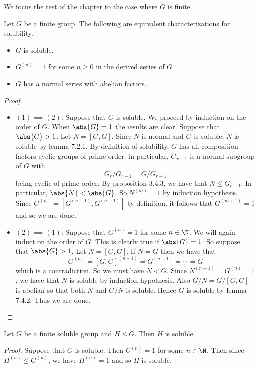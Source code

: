 \documentclass[a4paper]{article}
\begin{document}
We focus the rest of the chapter to the case where $G$ is finite. 

\begin{thm}{}{} Let $G$ be a finite group. The following are equivalent characterizations for solubility. 
\begin{itemize}
\item $G$ is soluble. 
\item $G^{(n)}=1$ for some $n\geq 0$ in the derived series of $G$
\item $G$ has a normal series with abelian factors. 
\end{itemize} 
\begin{proof}~\\
\begin{itemize}
\item $(1)\implies(2)$: Suppose that $G$ is soluble. We proceed by induction on the order of $G$. When $\abs{G}=1$ the results are clear. Suppose that $\abs{G}>1$. Let $N=[G,G]$. Since $N$ is normal and $G$ is soluble, $N$ is soluble by lemma 7.2.1. By definition of solubility, $G$ has all composition factors cyclic groups of prime order. In particular, $G_{r-1}$ is a normal subgroup of $G$ with $$G_r/G_{r-1}=G/G_{r-1}$$ being cyclic of prime order. By proposition 3.4.3, we have that $N\leq G_{r-1}$. In particular, $\abs{N}<\abs{G}$. So $N^{(m)}=1$ by induction hypothesis. Since $G^{(n)}=[G^{(n-1)},G^{(n-1)}]$ by definition, it follows that $G^{(m+1)}=1$ and so we are done. 
\item $(2)\implies(1)$: Suppose that $G^{(n)}=1$ for some $n\in\N$. We will again induct on the order of $G$. This is clearly true if $\abs{G}=1$. So suppose that $\abs{G}>1$. Let $N=[G,G]$. If $N=G$ then we have that $$G^{(n)}=[G,G]^{(n-1)}=G^{(n-1)}=\cdots=G$$ which is a contradiction. So we must have $N<G$. Since $N^{(n-1)}=G^{(n)}=1$, we have that $N$ is soluble by induction hypothesis. Also $G/N=G/[G,G]$ is abelian so that both $N$ and $G/N$ is soluble. Hence $G$ is soluble by lemma 7.4.2. Thus we are done. 
\end{itemize}
\end{proof}
\end{thm}

\begin{crl}{}{} Let $G$ be a finite soluble group and $H\leq G$. Then $H$ is soluble. 
\begin{proof}
Suppose that $G$ is soluble. Then $G^{(n)}=1$ for some $n\in\N$. Then since $H^{(n)}\leq G^{(n)}$, we have $H^{(n)}=1$ and so $H$ is soluble. 
\end{proof}
\end{crl}
\end{document}
